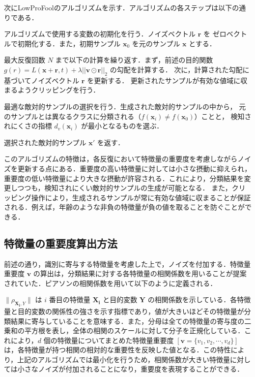 次にLowProFoolのアルゴリズムを示す．アルゴリズムの各ステップは以下の通りである．
\begin{algorithm_step}
    \item[Step 1)] アルゴリズムで使用する変数の初期化を行う．ノイズベクトル $\bm{r}$ を
        ゼロベクトルで初期化する．また，初期サンプル $\bm{x}_0$ を元のサンプル $\bm{x}$ とする．
    
    \item[Step 2)] 最大反復回数 $N$ まで以下の計算を繰り返す．まず，前述の目的関数 
        $g(r) = L(\bm{x}+\bm{r}, t) + \lambda ||\bm{v} \odot \bm{r}||_2$ の勾配を計算する．
        次に，計算された勾配に基づいてノイズベクトル $\bm{r}$ を更新する．
        更新されたサンプルが有効な値域に収まるようクリッピングを行う．
    
    \item[Step 3)] 最適な敵対的サンプルの選択を行う．生成された敵対的サンプルの中から，
        元のサンプルとは異なるクラスに分類される（$f(\bm{x}_i) \neq f(\bm{x}_0)$）ことと，
        検知されにくさの指標 $d_v(\bm{x}_i)$ が最小となるものを選ぶ．
    
    \item[Step 4)] 選択された敵対的サンプル $\bm{x}'$ を返す．
    \end{algorithm_step}


このアルゴリズムの特徴は，各反復において特徴量の重要度を考慮しながらノイズを更新する点にある．重要度の高い特徴量に対しては小さな摂動に抑えられ，重要度の低い特徴量により大きな摂動が許容される．これにより，分類結果を変更しつつも，検知されにくい敵対的サンプルの生成が可能となる．
また，クリッピング操作により，生成されるサンプルが常に有効な値域に収まることが保証される．例えば，年齢のような非負の特徴量が負の値を取ることを防ぐことができる．


\subsection{特徴量の重要度算出方法}

前述の通り，識別に寄与する特徴量を考慮した上で，ノイズを付加する．特徴量重要度 $\bm{v}$ の算出は，分類結果に対する各特徴量の相関係数を用いることが提案されていた．ピアソンの相関係数を用いて以下のように定義される．

$\|\rho_{\bm{X_i},Y}\|$ は $i$ 番目の特徴量 $\bm{X_i}$ と目的変数 $\bm{Y}$ の相関係数を示している．各特徴量と目的変数の関係性の強さを示す指標であり，値が大きいほどその特徴量が分類結果に寄与していることを意味する．また，分母は全ての特徴量の寄与度の二乗和の平方根を表し，全体の相関のスケールに対して分子を正規化している．これにより，$d$ 個の特徴量についてまとめた特徴量重要度 $[ \bm{v} = \{v_1, v_2, \cdots, v_d\} ]$ は，各特徴量が持つ相関の相対的な重要性を反映した値となる．この特性により，上記のアルゴリズムでは最小化を行うため，相関係数が大きい特徴量に対しては小さなノイズが付加されることになり，重要度を表現することができる．

